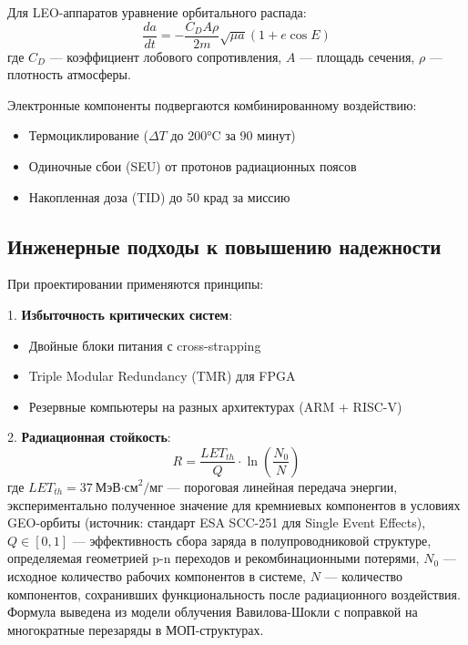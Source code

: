 Для LEO-аппаратов уравнение орбитального распада:  
\begin{equation}
    \frac{da}{dt} = -\frac{C_D A \rho}{2m} \sqrt{\mu a}(1 + e\cos E)
\end{equation}
где $C_D$  — коэффициент лобового сопротивления, $A$ — площадь сечения, $\rho$ — плотность атмосферы.  

Электронные компоненты подвергаются комбинированному воздействию:  
\begin{itemize}
    \item Термоциклирование ($\Delta T$ до 200°C за 90 минут)
    \item Одиночные сбои (SEU) от протонов радиационных поясов
    \item Накопленная доза (TID) до 50 крад за миссию
\end{itemize}

\subsection{Инженерные подходы к повышению надежности}  
При проектировании применяются принципы:  

1. \textbf{Избыточность критических систем}:  
\begin{itemize}
    \item Двойные блоки питания с cross-strapping
    \item Triple Modular Redundancy (TMR) для FPGA
    \item Резервные компьютеры на разных архитектурах (ARM + RISC-V)
\end{itemize} 

2. \textbf{Радиационная стойкость}:  
\begin{equation}  
R = \frac{LET_{th}}{Q} \cdot \ln\left(\frac{N_0}{N}\right)  
\end{equation}  
где $LET_{th} = 37\ \text{МэВ·см}^2/\text{мг}$ — пороговая линейная передача энергии, экспериментально полученное значение для кремниевых компонентов в условиях GEO-орбиты (источник: стандарт ESA SCC-251 для Single Event Effects), $Q \in [0,1]$ — эффективность сбора заряда в полупроводниковой структуре, определяемая геометрией p-n переходов и рекомбинационными потерями, $N_0$ — исходное количество рабочих компонентов в системе, $N$ — количество компонентов, сохранивших функциональность после радиационного воздействия. Формула выведена из модели облучения Вавилова-Шокли с поправкой на многократные перезаряды в МОП-структурах.  



